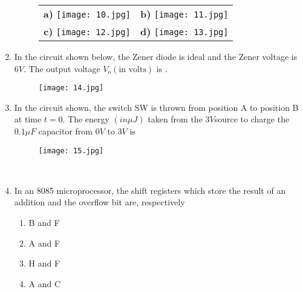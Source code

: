 \documentclass[12pt,-letter paper]{article}
\providecommand{\brak}[1]{\ensuremath{\left(#1\right)}}
\theoremstyle{remark}
\begin{document}
\begin{enumerate}
\begin{figure}[h]
  \centering
  \begin{tabular}{cc}
    \textbf{a)} \texttt{[image: 10.jpg]} & \hspace{3cm}  %
    \textbf{b)} \texttt{[image: 11.jpg]} \\        %
    \textbf{c)} \texttt{[image: 12.jpg]} & \hspace{3cm}  %
    \textbf{d)} \texttt{[image: 13.jpg]}
  \end{tabular}
 \end{figure}

\item In the circuit shown below, the Zener diode is ideal and the Zener voltage is $6V$. The output voltage $V_o$$\brak{\text{in volts}}$ is \underline{\hspace{1cm}}.
    \begin{figure}[H]
        \centering
        \texttt{[image: 14.jpg]}
    \end{figure}
\item In the circuit shown, the switch SW is thrown from position A to position B at time $t=0$. The energy \brak{in \mu J} taken from the $3V$source to charge the $0.1 \mu F$ capacitor from $0V$ to $3V$ is
    \begin{figure}[h]
        \centering
        \texttt{[image: 15.jpg]}
    \end{figure}\\
\item In an 8085 microprocessor, the shift registers which store the result of an addition and the overflow bit are, respectively 
    \begin{enumerate}
        \item B and F
        \item A and F
        \item H and F
        \item A and C
    \end{enumerate}


\end{enumerate}
\end{document}
